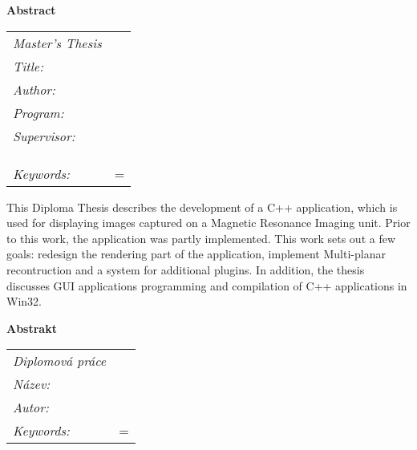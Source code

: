 \thispagestyle{empty}

\newbox\odstavecbox
\newlength\vyskaodstavce
\newcommand\odstavec[2]{
    \setbox\odstavecbox=\hbox{
         \parbox[t]{#1}{#2\vrule width 0pt depth 4pt}}
    \global\vyskaodstavce=\dp\odstavecbox
    \box\odstavecbox}
\newcommand{\delka}{120mm}


\newcommand{\pracovisteVed}{\km,\\ \fjfi,\\ \cvut}

\newcommand{\konzultant}{}
\newcommand{\pracovisteKonz}{}

\newcommand{\klicova}{grafické uživatelské rozhraní, lékařské vizualizace, objektově orientované programování, C++, Qt, DICOM}
\newcommand{\keywords}{graphical user interface, medical imaging, object-oriented programming, C++, Qt, DICOM}   



{\noindent \bf \large Abstract} \\[5mm]
\begin{tabular}{l p{10cm}}
	{\em Master's Thesis}	& 	\\[1mm]
	{\em Title:}	& \nazeven	\\[1mm]
	{\em Author:}	& \autor	\\[1mm]
	{\em Program:} 	& \obor		\\[1mm]
	{\em Supervisor:}& \vedouci	\\
				& \km		\\
				& \fjfi		\\
				& \cvut		\\[1mm]
	{\em Keywords:}	& \odstavec{\delka}{\keywords}	\\
\end{tabular}

This Diploma Thesis describes the development of a C++ application, which is used for displaying images captured on a Magnetic Resonance Imaging unit. Prior to this work, the application was partly implemented. This work sets out a few goals: redesign the rendering part of the application, implement Multi-planar recontruction and a system for additional plugins. In addition, the thesis discusses GUI applications programming and compilation of C++ applications in Win32.


\vspace{10mm}
{\noindent \bf \large Abstrakt} \\[5mm]
\begin{tabular}{l p{10cm}}
	{\em Diplomová práce}	& 	\\[1mm]
	{\em Název:}	& \nazevcz	\\[1mm]
	{\em Autor:}	& \autor	\\[1mm]
	{\em Keywords:}	& \odstavec{\delka}{\klicova}	\\
\end{tabular}

